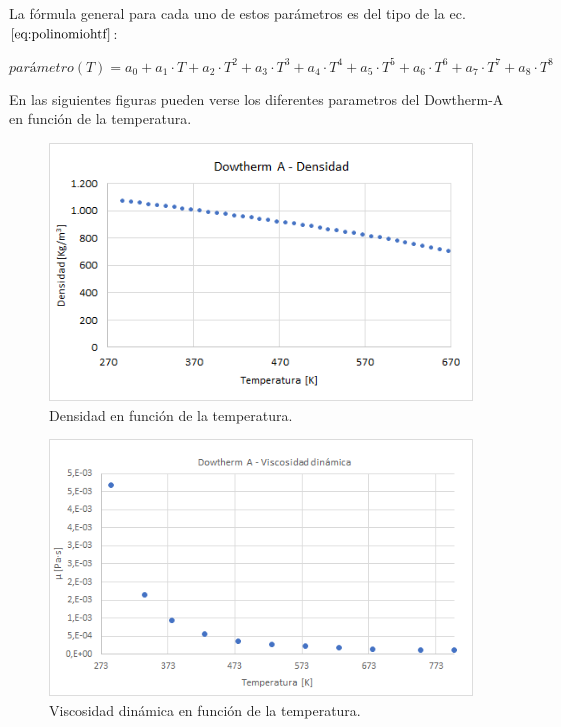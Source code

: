 \documentclass[11pt]{article}
\begin{document}
La fórmula general para cada uno de estos parámetros es del tipo de la
ec.\(\eqref{eq:polinomiohtf}\):

\begin{equation}
   parámetro(T) = a_0 + a_1 \cdot T + a_2 \cdot T^2 + a_3 \cdot T^3 + a_4 \cdot T^4 + a_5 \cdot T^5 + a_6 \cdot T^6 +  a_7 \cdot T^7 + a_8 \cdot T^8   
    \label{eq:polinomiohtf}
\end{equation}

En las siguientes figuras pueden verse los diferentes parametros del
Dowtherm-A en función de la temperatura.

\begin{figure}
\includegraphics[scale=0.8]{images/curva_densidad.png}
\caption{Densidad en función de la temperatura.} 
\label{fig:curvadensidad}
\end{figure}

\begin{figure}
\includegraphics[scale=0.8]{images/curva_viscosidad.png}
\caption{Viscosidad dinámica en función de la temperatura.} 
\label{fig:curvaviscosidad}
\end{figure}
\end{document}
